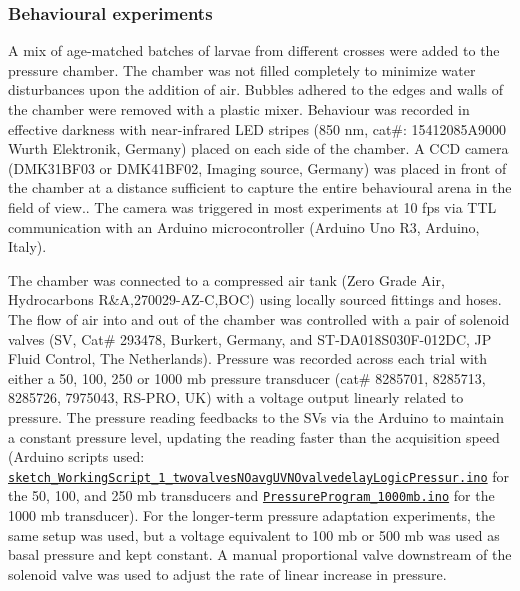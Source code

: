 \documentclass[
  11pt,
]{article}
\begin{document}
\subsubsection{Behavioural experiments}\label{behavioural-experiments}

A mix of age-matched batches of larvae from different crosses were added
to the pressure chamber. The chamber was not filled completely to
minimize water disturbances upon the addition of air. Bubbles adhered to
the edges and walls of the chamber were removed with a plastic mixer.
Behaviour was recorded in effective darkness with near-infrared LED
stripes (850 nm, cat\#: 15412085A9000 Wurth Elektronik, Germany) placed
on each side of the chamber. A CCD camera (DMK31BF03 or DMK41BF02,
Imaging source, Germany) was placed in front of the chamber at a
distance sufficient to capture the entire behavioural arena in the field
of view.. The camera was triggered in most experiments at 10 fps via TTL
communication with an Arduino microcontroller (Arduino Uno R3, Arduino,
Italy).

The chamber was connected to a compressed air tank (Zero Grade Air,
Hydrocarbons R\&A,270029-AZ-C,BOC) using locally sourced fittings and
hoses. The flow of air into and out of the chamber was controlled with a
pair of solenoid valves (SV, Cat\# 293478, Burkert, Germany, and
ST-DA018S030F-012DC, JP Fluid Control, The Netherlands). Pressure was
recorded across each trial with either a 50, 100, 250 or 1000 mb
pressure transducer (cat\# 8285701, 8285713, 8285726, 7975043, RS-PRO,
UK) with a voltage output linearly related to pressure. The pressure
reading feedbacks to the SVs via the Arduino to maintain a constant
pressure level, updating the reading faster than the acquisition speed
(Arduino scripts used:
\href{https://github.com/JekelyLab/Bezares_et_al_2023_Pressure/blob/main/Code/PressureControl/sketch_WorkingScript_1_twovalvesNOavgUVNOvalvedelayLogicPressur/sketch_WorkingScript_1_twovalvesNOavgUVNOvalvedelayLogicPressur.ino}{\texttt{sketch\_WorkingScript\_1\_twovalvesNOavgUVNOvalvedelayLogicPressur.ino}}
for the 50, 100, and 250 mb transducers and
\href{https://github.com/JekelyLab/Bezares_et_al_2023_Pressure/blob/main/Code/PressureControl/PressureProgram_1000mb/PressureProgram_1000mb.ino}{\texttt{PressureProgram\_1000mb.ino}}
for the 1000 mb transducer). For the longer-term pressure adaptation
experiments, the same setup was used, but a voltage equivalent to 100 mb
or 500 mb was used as basal pressure and kept constant. A manual
proportional valve downstream of the solenoid valve was used to adjust
the rate of linear increase in pressure.
\end{document}
